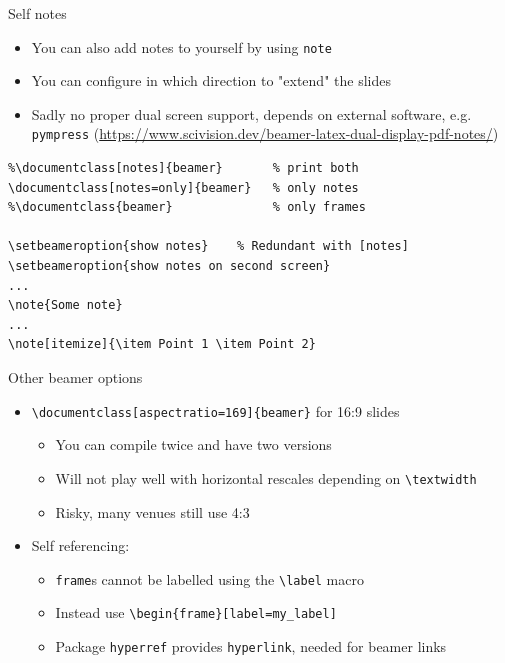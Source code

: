 \documentclass[english]{beamer}
\let\olditem\item
\renewcommand{\item}{\setlength{\itemsep}{\fill}\olditem}
\newenvironment{sitemize}{\let\item\olditem \begin{itemize}}{\vfill\end{itemize}}
\let\textttt\texttt
\renewcommand{\texttt}[1]{\colorbox{gray!10}{\textttt{#1}}}
\begin{document}
\begin{frame}[fragile]{Self notes}
    \begin{itemize}
        \item You can also add notes to yourself by using \texttt{note}
        \item You can configure in which direction to "extend" the slides 
        \item Sadly no proper dual screen support, depends on external software, e.g. \texttt{pympress} (\url{https://www.scivision.dev/beamer-latex-dual-display-pdf-notes/})
    \end{itemize}
\begin{verbatim}
%\documentclass[notes]{beamer}       % print both
\documentclass[notes=only]{beamer}   % only notes
%\documentclass{beamer}              % only frames

\setbeameroption{show notes}    % Redundant with [notes]
\setbeameroption{show notes on second screen}
...
\note{Some note}
...
\note[itemize]{\item Point 1 \item Point 2} 
\end{verbatim}
\end{frame}

\begin{frame}[fragile]{Other beamer options}
    \begin{itemize}
        \item \verb|\documentclass[aspectratio=169]{beamer}| for 16:9 slides
        \begin{sitemize}
            \item You can compile twice and have two versions
            \item Will not play well with horizontal rescales depending on \verb|\textwidth|
            \item Risky, many venues still use 4:3 
        \end{sitemize}
        \item Self referencing:
        \begin{sitemize}
            \item \texttt{frame}s cannot be labelled using the \verb|\label| macro
            \item Instead use \verb|\begin{frame}[label=my_label]|
            \item Package \texttt{hyperref} provides \texttt{hyperlink}, needed for beamer links
        \end{sitemize}
    \end{itemize}
\end{frame}
\end{document}
